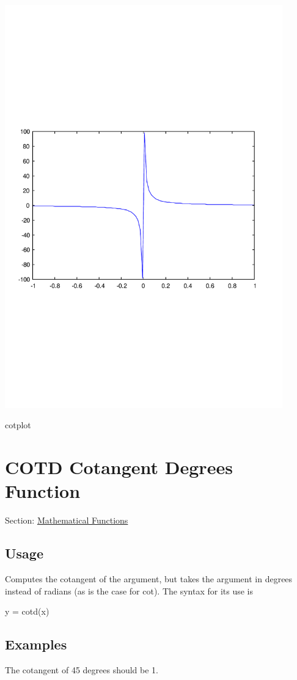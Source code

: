  
\begin{DoxyImage}
\includegraphics[width=12cm]{cotplot}
\caption{cotplot}
\end{DoxyImage}
 \hypertarget{mathfunctions_cotd}{}\section{C\-O\-T\-D Cotangent Degrees Function}\label{mathfunctions_cotd}
Section\-: \hyperlink{sec_mathfunctions}{Mathematical Functions} \hypertarget{vtkwidgets_vtkxyplotwidget_Usage}{}\subsection{Usage}\label{vtkwidgets_vtkxyplotwidget_Usage}
Computes the cotangent of the argument, but takes the argument in degrees instead of radians (as is the case for {\ttfamily cot}). The syntax for its use is \begin{DoxyVerb}   y = cotd(x)
\end{DoxyVerb}
 \hypertarget{variables_matrix_Examples}{}\subsection{Examples}\label{variables_matrix_Examples}
The cotangent of 45 degrees should be 1.


